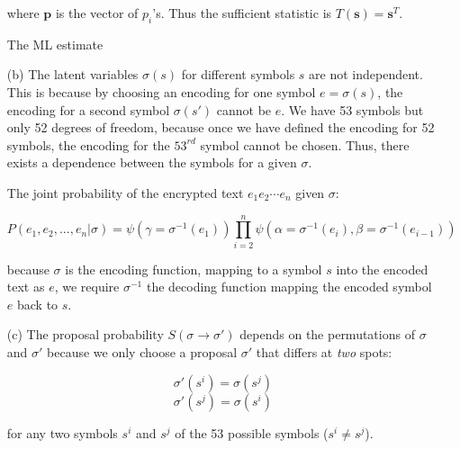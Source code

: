 \documentclass[12pt]{article}
\begin{document}
\begin{enumerate}
where $\textbf{p}$ is the vector of $p_i$'s.
Thus the sufficient statistic is $T(\textbf{s}) = \textbf{s}^T$.

The ML estimate








\item[(b)] The latent variables $\sigma(s)$ for different symbols $s$ are not independent.
This is because by choosing an encoding for one symbol $e = \sigma(s)$, the encoding for a second symbol $\sigma(s')$ cannot be $e$.
We have 53 symbols but only 52 degrees of freedom, because once we have defined the encoding for 52 symbols, the encoding for the $53^{rd}$ symbol cannot be chosen.
Thus, there exists a dependence between the symbols for a given $\sigma$.

The joint probability of the encrypted text $e_1 e_2 \cdots e_n$ given $\sigma$:

$$P(e_1, e_2,...,e_n|\sigma) = \psi(\gamma=\sigma^{-1}(e_1))\prod_{i=2}^n \psi(\alpha=\sigma^{-1}(e_i), \beta=\sigma^{-1}(e_{i-1}))$$

because $\sigma$ is the encoding function, mapping to a symbol $s$ into the encoded text as $e$, we require $\sigma^{-1}$ the decoding function mapping the encoded symbol $e$ back to $s$.

\item[(c)] The proposal probability $S(\sigma \rightarrow \sigma')$ depends on the permutations of $\sigma$ and $\sigma'$ because we only choose a proposal $\sigma'$ that differs at \textit{two} spots:

$$\sigma'(s^i) = \sigma(s^j)$$
$$\sigma'(s^j) = \sigma(s^i)$$

for any two symbols $s^i$ and $s^j$ of the 53 possible symbols ($s^i \neq s^j$).


\end{enumerate}
\end{document}
